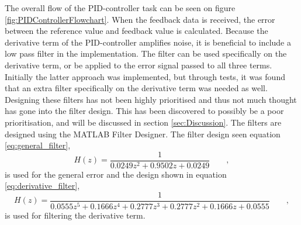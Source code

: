 \documentclass[../../main.tex]{subfiles}
\begin{document}
The overall flow of the PID-controller task can be seen on figure \ref{fig:PIDControllerFlowchart}. When the feedback data is received, the error between the reference value and feedback value is calculated. Because the derivative term of the PID-controller amplifies noise, it is beneficial to include a low pass filter in the implementation. The filter can be used specifically on the derivative term, or be applied to the error signal passed to all three terms. Initially the latter approach was implemented, but through tests, it was found that an extra filter specifically on the derivative term was needed as well. Designing these filters has not been highly prioritised and thus not much thought has gone into the filter design. This has been discovered to possibly be a poor prioritisation, and will be discussed in section \ref{sec:Discussion}. The filters are designed using the MATLAB Filter Designer. The filter design seen equation \ref{eq:general_filter},
\begin{equation}\label{eq:general_filter}
    H(z) = \frac{1}{0.0249z^2 + 0.9502z + 0.0249} \qquad ,
\end{equation}
is used for the general error and the design shown in equation \ref{eq:derivative_filter},
\begin{equation}\label{eq:derivative_filter}
    H(z) = \frac{1}{0.0555z^5 + 0.1666z^4 + 0.2777z^3 + 0.2777z^2 + 0.1666z + 0.0555} \qquad ,
\end{equation}
is used for filtering the derivative term.






\end{document}
